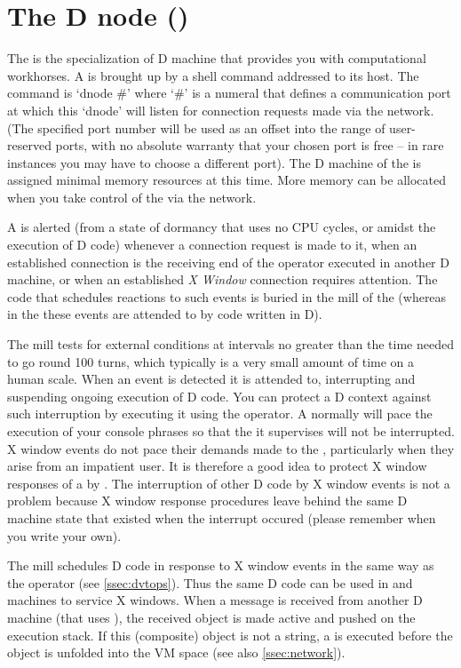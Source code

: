 \section{The D node ()}\label{sec:dnode}

The  is the specialization of D machine that provides you
with computational workhorses. A  is brought up by a
shell command addressed to its host. The command is `dnode \#' where
`\#' is a numeral that defines a communication port at which this
`dnode' will listen for connection requests made via the network. (The
specified port number will be used as an offset into the range of
user-reserved ports, with no absolute warranty that your chosen port
is free -- in rare instances you may have to choose a different
port). The D machine of the  is assigned minimal memory
resources at this time. More memory can be allocated when you take
control of the  via the network.

A  is alerted (from a state of dormancy that uses no CPU
cycles, or amidst the execution of D code) whenever a connection
request is made to it, when an established connection is the receiving
end of the  operator executed in another D machine, or when
an established \emph{X Window} connection requires attention. The code
that schedules reactions to such events is buried in the mill of the
 (whereas in the  these events are attended to
by code written in D).

The  mill tests for external conditions at intervals no
greater than the time needed to go round 100 turns, which typically is
a very small amount of time on a human scale. When an event is
detected it is attended to, interrupting and suspending ongoing
execution of D code.  You can protect a D context against such
interruption by executing it using the  operator. A
 normally will pace the execution of your console phrases
so that the  it supervises will not be
interrupted. X window events do not pace their demands made to the
, particularly when they arise from an impatient user. It
is therefore a good idea to protect X window responses of a
 by . The interruption of other D code by X
window events is not a problem because X window response procedures
leave behind the same D machine state that existed when the interrupt
occured (please remember when you write your own).

The  mill schedules D code in response to X window events
in the same way as the  operator  (see
\ref{ssec:dvtops}). Thus the same D code can be used in 
and  machines to service X windows. When a message is
received from another D machine (that uses ), the received
object is made active and pushed on the execution stack. If this
(composite) object is not a string, a  is executed before
the object is unfolded into the VM space (see also
\ref{ssec:network}).

